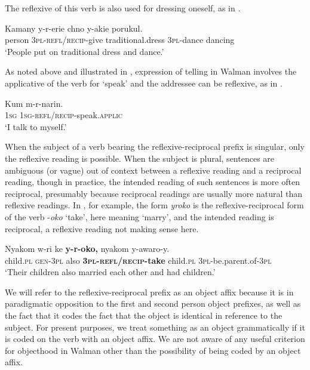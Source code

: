 \documentclass[output=paper]{langscibook}
\begin{document}
          
The reflexive of this verb is also used for dressing oneself, as in .


\ea%
    \label{ex:Brown:17}
    \gll Kamany  y-r-erie  chno  y-akie  porukul.\\
 person  \textsc{3pl}{}-\textsc{refl/recip}{}-give  traditional.dress  \textsc{3pl}{}-dance  dancing\\
    \glt ‘People put on traditional dress and dance.’
    \z

      
  As noted above and illustrated in , expression of telling in Walman involves the applicative of the verb for ‘speak’ and the addressee can be reflexive, as in .



\ea%
    \label{ex:Brown:18}
    \gll Kum  m-r-narin.\\
 \textsc{1sg}  \textsc{1sg-refl/recip-}speak.\textsc{applic}\\
    \glt  ‘I talk to myself.’
    \z


  When the subject of a verb bearing the reflexive-reciprocal prefix is singular, only the reflexive reading is possible. When the subject is plural, sentences are ambiguous (or vague) out of context between a reflexive reading and a reciprocal reading, though in practice, the intended reading of such sentences is more often reciprocal, presumably because reciprocal readings are usually more natural than reflexive readings. In , for example, the form \emph{yroko} is the reflexive-reciprocal form of the verb -\emph{oko} ‘take’, here meaning ‘marry’, and the intended reading is reciprocal, a reflexive reading not making sense here.

\ea%
    \label{ex:Brown:19}
    \gll Nyakom  w-ri  ke  \textbf{y-r-oko,}  nyakom  y-awaro-y.  \\
 child.\textsc{pl}  \textsc{gen}{}-\textsc{3pl}  also  \textbf{\textsc{3pl}}\textbf{{}-}\textbf{\textsc{refl/recip}}\textbf{{}-take}  child.\textsc{pl}  \textsc{3pl}{}-be.parent.of-\textsc{3pl}  \\
    \glt ‘Their children also married each other and had children.’
    \z

  We will refer to the reflexive-reciprocal prefix as an object affix because it is in paradigmatic opposition to the first and second person object prefixes, as well as the fact that it codes the fact that the object is identical in reference to the subject. For present purposes, we treat something as an object grammatically if it is coded on the verb with an object affix. We are not aware of any useful criterion for objecthood in Walman other than the possibility of being coded by an object affix.
\end{document}
